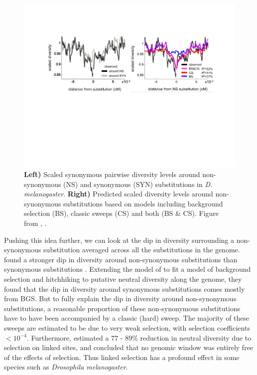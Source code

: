 \begin{figure}
\begin{center}
\includegraphics[width=\textwidth]{Journal_figs/recom_selection/Elyashiv_around_subs/Elyashiv_around_subs.pdf}
\end{center}
\caption{ {\bf Left) }  Scaled synonymous pairwise diversity levels around non-synonymous
  (NS) and synonymous (SYN) substitutions in {\it
    D. melanogaster}. {\bf Right)} Predicted scaled diversity levels
  around non-synonymous substitutions based on models including
  background selection (BS), classic sweeps (CS) and both (BS \&
  CS). Figure from \citet{elyashiv2016genomic}, \PLOSccBY.} \label{fig:Elyashiv_around_subs}
\end{figure}

Pushing this idea further, we can look at the dip in diversity
surrounding a non-synonymous substitution averaged across all the
substitutions in the genome. \citet{elyashiv2016genomic} found a
stronger dip in diversity around non-synonymous substitutions than
synonymous substitutions \citep[see also
][]{sattath2011pervasive}. Extending
the model of \citet{Mcvicker:09} to fit a model of background selection and
hitchhiking to putative neutral diversity along the genome, they found that
the dip in diversity around synonymous substitutions comes mostly from
BGS. But to fully explain the dip in diversity around non-synonymous
substitutions, a reasonable proportion of these non-synonymous
substitutions have to have been accompanied by a classic (hard)
sweep. The majority of these sweeps are estimated to be due to very
weak selection, with selection coefficients $<10^{-4}$. Furthermore, \citet{elyashiv2016genomic} estimated a
 $77$ - $89\%$ reduction in neutral diversity due to selection on linked sites, and concluded that no genomic window was entirely
free of the effects of selection. Thus linked selection has a profound
effect in some species such as {\it Drosophila melanogaster}. 





